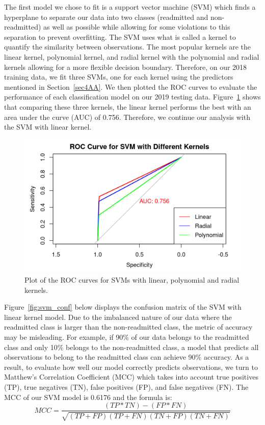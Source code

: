 \documentclass[sn-basic,pdflatex]{sn-jnl}
\theoremstyle{remark}
\theoremstyle{definition}
\begin{document}
The first model we chose to fit is a support vector machine (SVM) which
finds a hyperplane to separate our data into two classes (readmitted and
non-readmitted) as well as possible while allowing for some violations
to this separation to prevent overfitting. The SVM uses what is called a
kernel to quantify the similarity between observations. The most popular
kernels are the linear kernel, polynomial kernel, and radial kernel with
the polynomial and radial kernels allowing for a more flexible decision
boundary. Therefore, on our 2018 training data, we fit three SVMs, one
for each kernel using the predictors mentioned in Section~\ref{sec4AA}.
We then plotted the ROC curves to evaluate the performance of each
classification model on our 2019 testing data. Figure~\ref{fig:svm_roc}
shows that comparing these three kernels, the linear kernel performs the
best with an area under the curve (AUC) of 0.756. Therefore, we continue
our analysis with the SVM with linear kernel. \newline

\begin{figure}[H]

{\centering \includegraphics[width=1\linewidth]{figures/svm_roc} 

}

\caption{Plot of the ROC curves for SVMs with linear, polynomial and radial kernels.}\label{fig:svm_roc}
\end{figure}

Figure~\ref{fig:svm_conf} below displays the confusion matrix of the SVM
with linear kernel model. Due to the imbalanced nature of our data where
the readmitted class is larger than the non-readmitted class, the metric
of accuracy may be misleading. For example, if 90\% of our data belongs
to the readmitted class and only 10\% belongs to the non-readmitted
class, a model that predicts all observations to belong to the
readmitted class can achieve 90\% accuracy. As a result, to evaluate how
well our model correctly predicts observations, we turn to Matthew's
Correlation Coefficient (MCC) which takes into account true positives
(TP), true negatives (TN), false positives (FP), and false negatives
(FN). The MCC of our SVM model is 0.6176 and the formula is: \newline \[
MCC = \frac{(TP*TN) - (FP*FN)}{\sqrt{(TP+FP)(TP+FN)(TN+FP)(TN+FN)}}
\]
\end{document}
